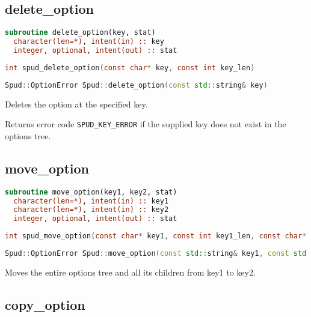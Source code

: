 \documentclass[a4paper, 11pt]{book}
\begin{document}
\subsection{delete\_option}

\begin{lstlisting}[language=fortran]
subroutine delete_option(key, stat)
  character(len=*), intent(in) :: key
  integer, optional, intent(out) :: stat
\end{lstlisting}

\begin{lstlisting}[language=C]
int spud_delete_option(const char* key, const int key_len)
\end{lstlisting}

\begin{lstlisting}[language=C++]
Spud::OptionError Spud::delete_option(const std::string& key)
\end{lstlisting}

Deletes the option at the specified key.

Returns error code \lstinline+SPUD_KEY_ERROR+ if the supplied key does not
exist in the options tree.

\subsection{move\_option}

\begin{lstlisting}[language=fortran]
subroutine move_option(key1, key2, stat)
  character(len=*), intent(in) :: key1
  character(len=*), intent(in) :: key2
  integer, optional, intent(out) :: stat
\end{lstlisting}

\begin{lstlisting}[language=C]
int spud_move_option(const char* key1, const int key1_len, const char* key2, const int key2_len)
\end{lstlisting}

\begin{lstlisting}[language=C++]
Spud::OptionError Spud::move_option(const std::string& key1, const std::string& key2)
\end{lstlisting}

Moves the entire options tree and all its children from key1 to key2.

\subsection{copy\_option}
\end{document}
